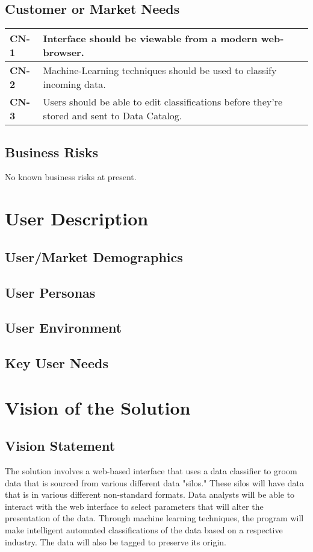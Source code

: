 \documentclass[12pt,oneside,letterpaper]{article}
\begin{document}
\subsection{Customer or Market Needs}
\begin{tabular}{|p{1in}p{4.5in}|}
\hline
\textbf{CN-1}&Interface should be viewable from a modern web-browser.\\
\hline
\textbf{CN-2}&Machine-Learning techniques should be used to classify incoming data.\\
\hline
\textbf{CN-3}&Users should be able to edit classifications before they're stored and sent to Data Catalog.\\
\hline
\end{tabular}
\subsection{Business Risks}
No known business risks at present.

\section{User Description}
\subsection{User/Market Demographics}
\subsection{User Personas}
\subsection{User Environment}
\subsection{Key User Needs}

\section{Vision of the Solution}
\subsection{Vision Statement}
The solution involves a web-based interface that uses a data classifier to groom data that is sourced from various different data "silos." These silos will have data that is in various different non-standard formats.
\newline
\newline
Data analysts will be able to interact with the web interface to select parameters that will alter the presentation of the data. Through machine learning techniques, the program will make intelligent automated classifications of the data based on a respective industry. The data will also be tagged to preserve its origin.  
\end{document}
